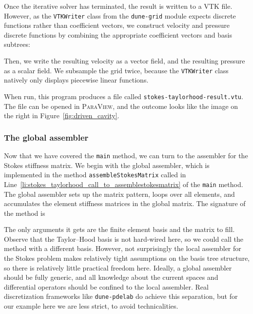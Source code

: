 \documentclass[a4paper,10pt,headings=normal,bibliography=totoc]{scrartcl}
\newcommand{\cpp}[1]{\lstinline[basicstyle=\ttfamily]!#1!}
\newcommand{\program}[1]{\textsc{#1}\xspace}
\newcommand{\dunemodule}[1]{\texttt{#1}}
\newcommand{\file}[1]{\texttt{#1}}
\begin{document}
Once the iterative solver has terminated, the result is written to a VTK file.
However, as the \cpp{VTKWriter} class from the \dunemodule{dune-grid} module
expects discrete functions rather than coefficient vectors, we construct
velocity and pressure discrete functions by combining the appropriate
coefficient vectors and basis subtrees:
%

%
Then, we write the resulting velocity as a vector field,
and the resulting pressure as a scalar field.  We subsample the grid twice, because the \cpp{VTKWriter}
class natively only displays piecewise linear functions.
%

%
When run, this program produces a file called \file{stokes-taylorhood-result.vtu}.  The file can be opened in
\program{ParaView}, and the outcome looks like the image on the right in Figure~\ref{fig:driven_cavity}.

\subsubsection{The global assembler}

Now that we have covered the \cpp{main} method, we can turn to the assembler for the Stokes stiffness matrix.
We begin with the global assembler,
which is implemented in the method \cpp{assembleStokesMatrix} called in Line~\ref{li:stokes_taylorhood_call_to_assemblestokesmatrix}
of the \cpp{main} method.
The global assembler sets up the matrix pattern, loops over all elements, and accumulates the element stiffness
matrices in the global matrix. The signature of the method is
%

%
The only arguments it gets are the finite element basis and the matrix to fill.  Observe that the Taylor--Hood basis is not
hard-wired here, so we could call the method with a different basis.
However, not surprisingly the local assembler for the Stokes problem makes relatively tight assumptions on the basis tree
structure, so there is relatively little practical freedom here.  Ideally, a global assembler should be fully
generic, and all knowledge about the current spaces and differential operators should be confined to the local
assembler.  Real discretization frameworks like \dunemodule{dune-pdelab} do achieve this separation,
but for our example here we are less strict, to avoid technicalities.
\end{document}
